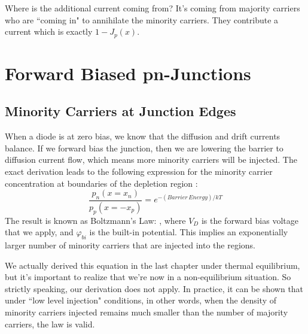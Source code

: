Where is the additional current coming from?  It's coming from majority carriers who are ``coming in" to annihilate the minority carriers.  They contribute a current which is exactly $1- J_p(x)$.  
 


\section{Forward Biased pn-Junctions}


\subsection{Minority Carriers at Junction Edges}

When a diode is at zero bias, we know that the diffusion and drift currents balance.  If we forward bias the junction, then we are lowering the barrier to diffusion current flow, which means more minority carriers will be injected.  The exact derivation leads to the following expression for the minority carrier concentration at boundaries of the depletion region :
% 
\begin{equation} 
	\frac{{{p_n}(x = {x_n})}}{{{p_p}(x =  - {x_p})}} =  {e^{ - (Barrier\,Energy)/kT}}
\end{equation}
%
The result is known as Boltzmann's Law:
, where $V_D$ is the forward bias voltage that we apply, and $\varphi_{bi}$ is the built-in potential.  This implies an exponentially larger number of minority carriers that are injected into the regions.

We actually derived this equation in the last chapter under thermal equilibrium, but it's important to realize that we're now in a non-equilibrium situation.  So strictly speaking, our derivation does not apply.  In practice, it can be shown that under ``low level injection" conditions, in other words, when the density of minority carriers injected remains much smaller than the number of majority carriers, the law is valid.


